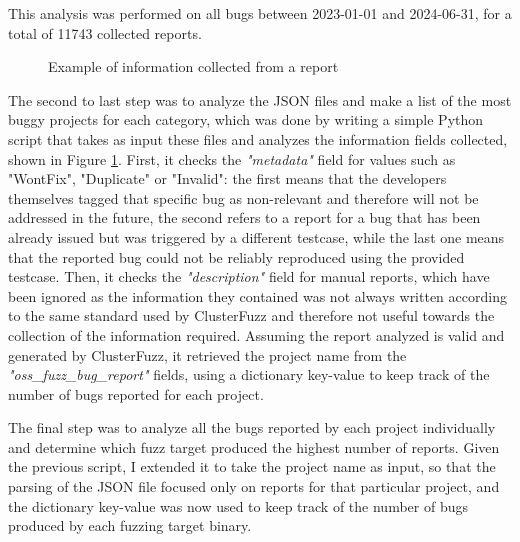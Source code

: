 This analysis was performed on all bugs between 2023-01-01 and 2024-06-31, for a total of 11743 collected reports.

\begin{figure}[h]
\caption{Example of information collected from a report}
\label{fig:report}
\end{figure}


The second to last step was to analyze the JSON files and make a list of the most buggy projects for each category, which was done by writing a simple Python script that takes as input these files and analyzes the information fields collected, shown in Figure \ref{fig:report}. First, it checks the \textit{"metadata"} field for values such as "WontFix", "Duplicate" or "Invalid": the first means that the developers themselves tagged that specific bug as non-relevant and therefore will not be addressed in the future, the second refers to a report for a bug that has been already issued but was triggered by a different testcase, while the last one means that the reported bug could not be reliably reproduced using the provided testcase. Then, it checks the \textit{"description"} field for manual reports, which have been ignored as the information they contained was not always written according to the same standard used by ClusterFuzz and therefore not useful towards the collection of the information required. Assuming the report analyzed is valid and generated by ClusterFuzz, it retrieved the project name from the \textit{"oss\_fuzz\_bug\_report"} fields, using a dictionary key-value to keep track of the number of bugs reported for each project. 

\newpage
The final step was to analyze all the bugs reported by each project individually and determine which fuzz target produced the highest number of reports. Given the previous script, I extended it to take the project name as input, so that the parsing of the JSON file focused only on reports for that particular project, and the dictionary key-value was now used to keep track of the number of bugs produced by each fuzzing target binary. 
\newline

